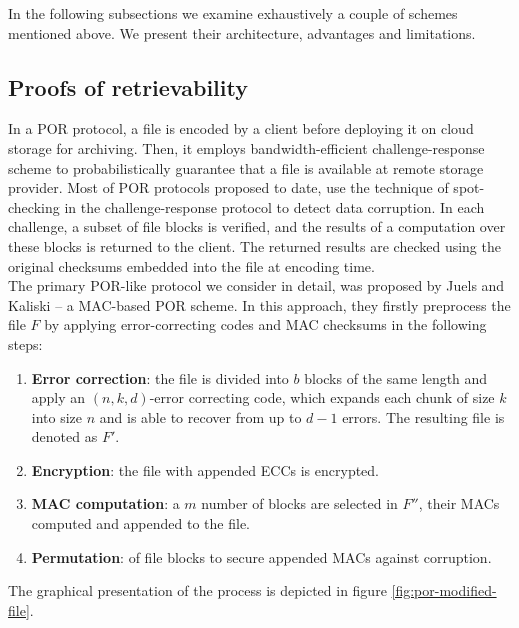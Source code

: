 In the following subsections we examine exhaustively a couple of schemes
mentioned above. We present their architecture, advantages and limitations.

\subsection{Proofs of retrievability}
In a POR \cite{por, por2} protocol, a file is encoded by a client before
deploying it on cloud storage for archiving. Then, it employs
bandwidth-efficient challenge-response scheme to probabilistically guarantee
that a file is available at remote storage provider. Most of POR protocols 
proposed to date, use the technique of spot-checking in the challenge-response
protocol to detect data corruption. In each challenge, a subset of file blocks
is verified, and the results of a computation over these blocks is returned to
the client. The returned results are checked using the original checksums
embedded into the file at encoding time.\\

The primary POR-like protocol we consider in detail, was proposed by Juels and
Kaliski \cite{por} -- a MAC-based POR scheme. In this approach, they firstly
preprocess the file $F$ by applying error-correcting codes and MAC checksums
in the following steps:

\begin{enumerate}
	\item \textbf{Error correction}: the file is divided into $b$ blocks of the
	same length and apply an $(n,k,d)$-error correcting code,
	which expands each chunk of size $k$ into size $n$ and is able to recover
	from up to $d-1$ errors. The resulting file is denoted as $F'$.
	\item \textbf{Encryption}: the file with appended ECCs is encrypted.
	\item \textbf{MAC computation}: a $m$ number of blocks are selected in
	$F''$, their MACs computed and appended to the file.
	\item \textbf{Permutation}: of file blocks to secure appended MACs against
	corruption.
\end{enumerate}

The graphical presentation of the process is depicted in figure \ref{fig:por-modified-file}.\\

